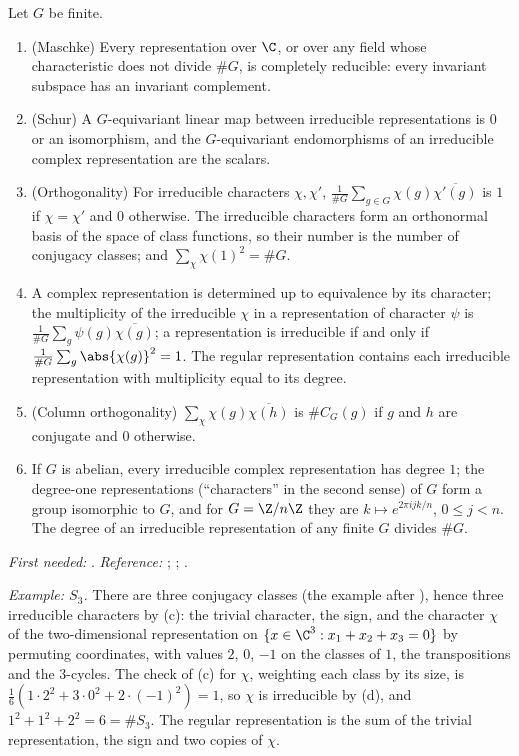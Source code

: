 \begin{theorem}\label{thm:prereq:reps}
Let $G$ be finite.
\begin{enumerate}[label=(\alph*)]
\item (Maschke) Every representation over $\C$, or over any field whose characteristic does not
divide $\#G$, is completely reducible: every invariant subspace has an invariant complement.
\item (Schur) A $G$-equivariant linear map between irreducible representations is $0$ or an
isomorphism, and the $G$-equivariant endomorphisms of an irreducible complex representation are the
scalars.
\item (Orthogonality) For irreducible characters $\chi,\chi'$,
$\frac1{\#G}\sum_{g\in G}\chi(g)\overline{\chi'(g)}$ is $1$ if $\chi=\chi'$ and $0$ otherwise. The
irreducible characters form an orthonormal basis of the space of class functions, so their number
is the number of conjugacy classes; and $\sum_\chi\chi(1)^2=\#G$.
\item A complex representation is determined up to equivalence by its character; the multiplicity
of the irreducible $\chi$ in a representation of character $\psi$ is
$\frac1{\#G}\sum_g\psi(g)\overline{\chi(g)}$; a representation is irreducible if and only if
$\frac1{\#G}\sum_g\abs{\chi(g)}^2=1$. The regular representation contains each irreducible
representation with multiplicity equal to its degree.
\item (Column orthogonality) $\sum_\chi\chi(g)\overline{\chi(h)}$ is $\#C_G(g)$ if $g$ and $h$
are conjugate and $0$ otherwise.
\item If $G$ is abelian, every irreducible complex representation has degree $1$; the degree-one
representations (``characters'' in the second sense) of $G$ form a group isomorphic to $G$, and for
$G=\Z/n\Z$ they are $k\mapsto e^{2\pi ijk/n}$, $0\le j<n$. The degree of an irreducible
representation of any finite $G$ divides $\#G$.
\end{enumerate}
\end{theorem}
\noindent\emph{First needed:} . \emph{Reference:} \cite[Chapter 29]{RHB06};
\cite[Part I]{SerreLinearReps}; \cite[Chapter 18]{DummitFoote}.

\emph{Example: $S_3$.} There are three conjugacy classes (the example after ),
hence three irreducible characters by (c): the trivial character, the sign, and the character $\chi$
of the two-dimensional representation on $\{x\in\C^3:x_1+x_2+x_3=0\}$ by permuting coordinates, with
values $2$, $0$, $-1$ on the classes of $1$, the transpositions and the $3$-cycles. The check of
(c) for $\chi$, weighting each class by its size, is $\frac16(1\cdot2^2+3\cdot0^2+2\cdot(-1)^2)=1$,
so $\chi$ is irreducible by (d), and $1^2+1^2+2^2=6=\#S_3$. The regular representation is the sum of
the trivial representation, the sign and two copies of $\chi$.

